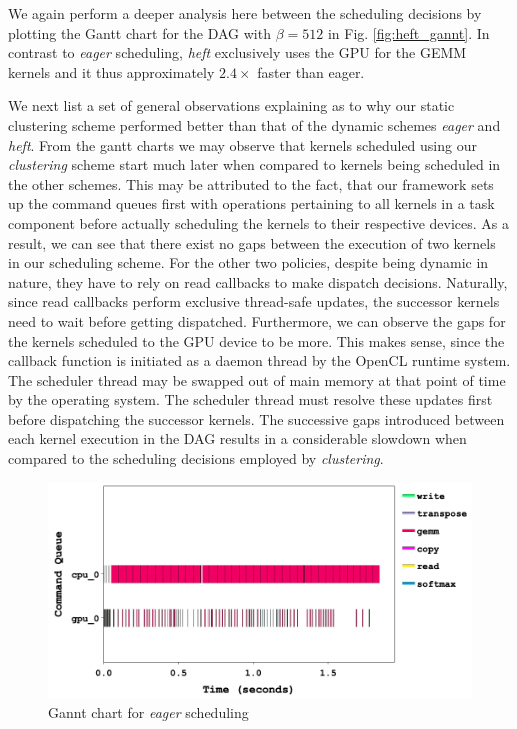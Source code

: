 	\par We again perform a deeper analysis here between the scheduling decisions by plotting the Gantt chart for the DAG with $\beta = 512$ in Fig. \ref{fig:heft_gannt}. In contrast to {\em eager} scheduling, {\em heft} exclusively uses the GPU for the GEMM kernels and it thus approximately $2.4 \times$ faster than eager. 
	\par We next list a set of general observations explaining as to why our static clustering scheme performed better than that of the dynamic schemes {\em eager} and {\em heft}. From the gantt charts we may observe that kernels scheduled using our {\em clustering} scheme start much later when compared to kernels being scheduled in the other schemes. This may be attributed to the fact, that our framework sets up the command queues first with operations pertaining to all kernels in a task component  before actually scheduling the kernels to their respective devices. As a result, we can see that there exist no gaps between the execution of two kernels in our scheduling scheme.
	For the other two policies, despite being dynamic in nature, they have to rely on read callbacks to make dispatch decisions. Naturally, since read callbacks perform exclusive thread-safe updates, the successor kernels need to wait before getting dispatched. Furthermore, we can observe the gaps for the kernels scheduled to the GPU device to be more. This makes sense, since the callback function is initiated as a daemon thread by the OpenCL runtime system. The scheduler thread may be swapped out of main memory at that point of time by the operating system. The scheduler thread must resolve these updates first before dispatching the successor kernels. The successive gaps introduced between each kernel execution in the DAG results in a considerable slowdown when compared to the scheduling decisions employed by {\em clustering}. 
	\begin{figure}[ht]
		\centering
		\includegraphics[scale=0.40]{Pictures/eager_gannt.png}
		\caption{\small Gannt chart for {\em eager} scheduling \label{fig:eager_gannt}}
	\end{figure}
